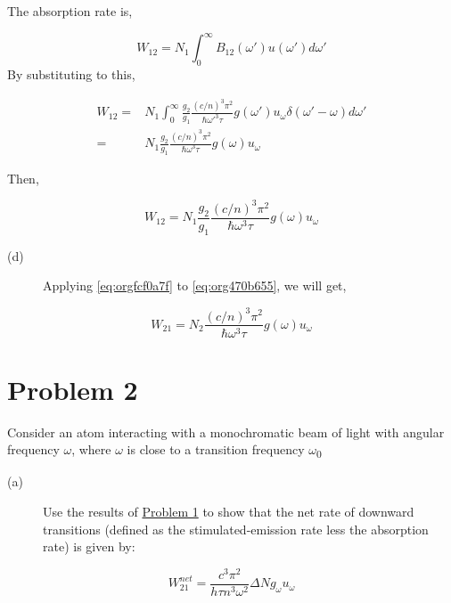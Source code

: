 \documentclass[a4paper,11pt]{article}
\begin{document}
The absorption rate is,

\begin{equation}
\label{eq:org470b655}
W_{12} = N_1\int_0^{\infty} B_{12}(\omega') u(\omega') d\omega'
\end{equation}
By substituting to this,

\begin{equation}
\begin{split}
W_{12} = &  N_1\int_0^{\infty} \frac{g_2}{g_1}\frac{(c/n)^3 \pi^2}{\hbar \omega'^3\tau} g(\omega')  u_\omega\delta(\omega'-\omega)d\omega'\\
= & N_1\frac{g_2}{g_1}\frac{(c/n)^3 \pi^2}{\hbar \omega^3\tau} g(\omega) u_\omega
\end{split}
\end{equation}

Then,

\begin{equation}
\label{eq:org1946559}
W_{12} =  N_1\frac{g_2}{g_1}\frac{(c/n)^3 \pi^2}{\hbar \omega^3\tau} g(\omega) u_\omega
\end{equation}

\begin{description}
\item[{(d)}] Applying \ref{eq:orgfcf0a7f} to \ref{eq:org470b655}, we will get,
\end{description}


\begin{equation}
\label{eq:orga549cd3}
W_{21} =  N_2 \frac{(c/n)^3 \pi^2}{\hbar \omega^3\tau} g(\omega) u_\omega
\end{equation}

\newpage
\section*{Problem 2}
\label{sec:org0e86cc0}
Consider an atom interacting with a monochromatic beam of light with angular frequency \(\omega\), where \(\omega\) is close to a transition frequency \(\omega\)\textsubscript{0}

\begin{description}
\item[{(a)}] Use the results of \hyperref[sec:orgcf1d1cb]{Problem 1} to show that the net rate of downward transitions (defined as the stimulated-emission rate less the absorption rate) is given by:
\end{description}


$$W_{21}^{net} = \frac{ c^3 \pi^2 }{h \tau n^3 \omega^2} \Delta N g_{\omega} u_{\omega}$$
\end{document}
